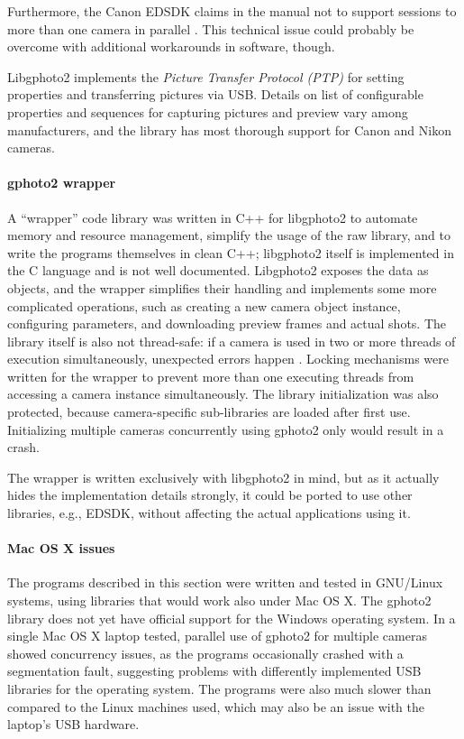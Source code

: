 Furthermore, the Canon EDSDK claims in the manual not to support sessions to more than one camera in parallel \cite{canonedsdk}.
This technical issue could probably be overcome with additional workarounds in software, though.

Libgphoto2 implements the \emph{Picture Transfer Protocol (PTP)} \cite{ptp} for setting properties and transferring pictures via USB.
Details on list of configurable properties and sequences for capturing pictures and preview vary among manufacturers, and the library has most thorough support for Canon and Nikon cameras.

\paragraph{gphoto2 wrapper}
A ``wrapper'' code library was written in C++ for libgphoto2 to automate memory and resource management, simplify the usage of the raw library, and to write the programs themselves in clean C++; libgphoto2 itself is implemented in the C language and is not well documented.
Libgphoto2 exposes the data as objects, and the wrapper simplifies their handling and implements some more complicated operations, such as creating a new camera object instance, configuring parameters, and downloading preview frames and actual shots.
The library itself is also not thread-safe: if a camera is used in two or more threads of execution simultaneously, unexpected errors happen \cite{gphoto2}.
Locking mechanisms were written for the wrapper to prevent more than one executing threads from accessing a camera instance simultaneously.
The library initialization was also protected, because camera-specific sub-libraries are loaded after first use.
Initializing multiple cameras concurrently using gphoto2 only would result in a crash.

The wrapper is written exclusively with libgphoto2 in mind, but as it actually hides the implementation details strongly, it could be ported to use other libraries, e.g., EDSDK, without affecting the actual applications using it.

\paragraph{Mac OS X issues}
The programs described in this section were written and tested in GNU/Linux systems, using libraries that would work also under Mac OS X.
The gphoto2 library does not yet have official support for the Windows operating system.
In a single Mac OS X laptop tested, parallel use of gphoto2 for multiple cameras showed concurrency issues, as the programs occasionally crashed with a segmentation fault, suggesting problems with differently implemented USB libraries for the operating system.
The programs were also much slower than compared to the Linux machines used, which may also be an issue with the laptop's USB hardware.

